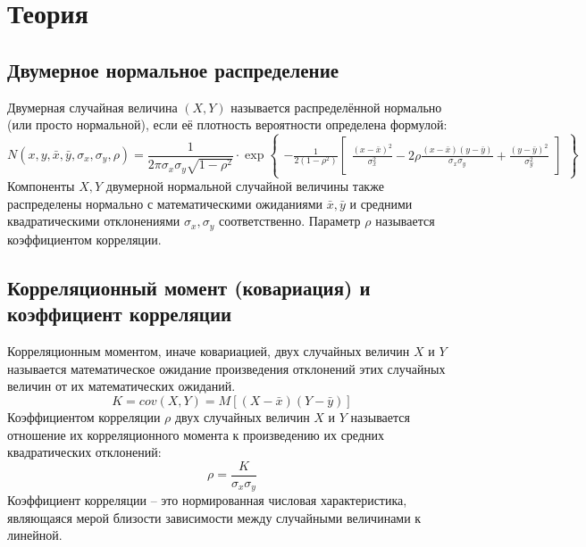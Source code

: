 \section{Теория}

\subsection{Двумерное нормальное распределение}
Двумерная случайная величина $(X, Y)$ называется распределённой нормально (или просто нормальной), если её плотность вероятности определена формулой:
\begin{equation}
	N(x, y, \bar{x}, \bar{y}, \sigma_x, \sigma_y, \rho) = 
	\dfrac{1}{2 \pi \sigma_x \sigma_y \sqrt{1 - \rho^2}} \cdot 
	\exp{\begin{Bmatrix}
			-\frac{1}{2 (1 - \rho^2)}
			\begin{bmatrix}
				\frac{(x - \bar{x})^2}{\sigma_{x}^2} 
				- 2 \rho \frac{(x - \bar{x})(y - \bar{y})}{\sigma_x \sigma_y} 
				+ \frac{(y - \bar{y})^2}{\sigma_{y}^2}
			\end{bmatrix}
		\end{Bmatrix}}
\end{equation}
Компоненты $X, Y$ двумерной нормальной случайной величины также распределены нормально с математическими ожиданиями $\bar{x}, \bar{y}$ и средними квадратическими отклонениями $\sigma_{x}, \sigma_{y}$ соответственно. Параметр $\rho$ называется коэффициентом корреляции.

\subsection{Корреляционный момент (ковариация) и коэффициент корреляции}
Корреляционным моментом, иначе ковариацией, двух случайных величин $X \text{ и } Y$ называется математическое ожидание произведения отклонений этих случайных величин от их математических ожиданий.
\begin{equation}
	K = cov(X, Y) = M[(X - \bar{x})(Y - \bar{y})]
\end{equation}
Коэффициентом корреляции $\rho$ двух случайных величин $X \text{ и } Y$ называется отношение их корреляционного момента к произведению их средних квадратических отклонений:
\begin{equation}
	\rho = \dfrac{K}{\sigma_{x} \sigma_{y}}
\end{equation}
Коэффициент корреляции -- это нормированная числовая характеристика, являющаяся мерой близости зависимости между случайными величинами к линейной.

